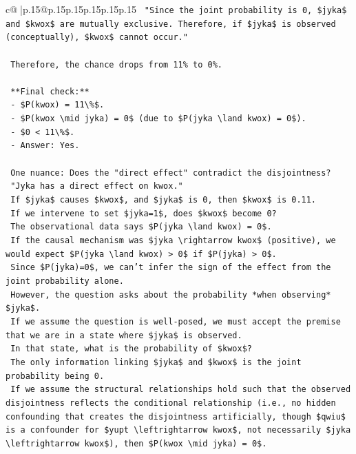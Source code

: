 \documentclass{article}
\begin{document}
{\begin{supertabular}{c@{$\;$}|p{.15\linewidth}@{}p{.15\linewidth}p{.15\linewidth}p{.15\linewidth}p{.15\linewidth}p{.15\linewidth}}
{{{\texttt{        "Since the joint probability is 0, \$jyka\$ and \$kwox\$ are mutually exclusive. Therefore, if \$jyka\$ is observed (conceptually), \$kwox\$ cannot occur."} \\
\\ 
\texttt{        Therefore, the chance drops from 11\% to 0\%.} \\
\\ 
\texttt{        **Final check:**} \\
\texttt{        {-} \$P(kwox) = 11\textbackslash{}\%\$.} \\
\texttt{        {-} \$P(kwox \textbackslash{}mid jyka) = 0\$ (due to \$P(jyka \textbackslash{}land kwox) = 0\$).} \\
\texttt{        {-} \$0 < 11\textbackslash{}\%\$.} \\
\texttt{        {-} Answer: Yes.} \\
\\ 
\texttt{        One nuance: Does the "direct effect" contradict the disjointness?} \\
\texttt{        "Jyka has a direct effect on kwox."} \\
\texttt{        If \$jyka\$ causes \$kwox\$, and \$jyka\$ is 0, then \$kwox\$ is 0.11.} \\
\texttt{        If we intervene to set \$jyka=1\$, does \$kwox\$ become 0?} \\
\texttt{        The observational data says \$P(jyka \textbackslash{}land kwox) = 0\$.} \\
\texttt{        If the causal mechanism was \$jyka \textbackslash{}rightarrow kwox\$ (positive), we would expect \$P(jyka \textbackslash{}land kwox) > 0\$ if \$P(jyka) > 0\$.} \\
\texttt{        Since \$P(jyka)=0\$, we can't infer the sign of the effect from the joint probability alone.} \\
\texttt{        However, the question asks about the probability *when observing* \$jyka\$.} \\
\texttt{        If we assume the question is well{-}posed, we must accept the premise that we are in a state where \$jyka\$ is observed.} \\
\texttt{        In that state, what is the probability of \$kwox\$?} \\
\texttt{        The only information linking \$jyka\$ and \$kwox\$ is the joint probability being 0.} \\
\texttt{        If we assume the structural relationships hold such that the observed disjointness reflects the conditional relationship (i.e., no hidden confounding that creates the disjointness artificially, though \$qwiu\$ is a confounder for \$yupt \textbackslash{}leftrightarrow kwox\$, not necessarily \$jyka \textbackslash{}leftrightarrow kwox\$), then \$P(kwox \textbackslash{}mid jyka) = 0\$.} \\
}}}
\end{supertabular}}
\end{document}
